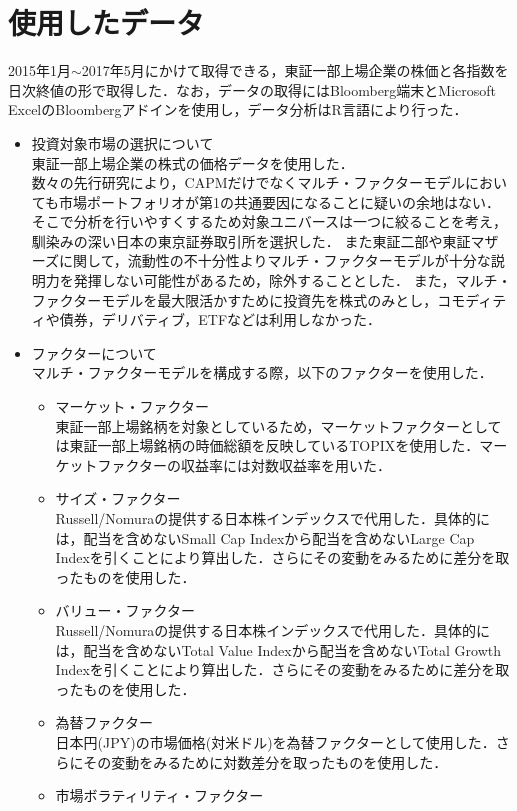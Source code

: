 \documentclass[11pt]{jreport}
\begin{document}
\section{使用したデータ}
2015年1月$\sim$2017年5月にかけて取得できる，東証一部上場企業の株価と各指数を日次終値の形で取得した．なお，データの取得にはBloomberg端末とMicrosoft ExcelのBloombergアドインを使用し，データ分析はR言語により行った．
\begin{itemize}
\item 投資対象市場の選択について\\
\quad 東証一部上場企業の株式の価格データを使用した．\\
\quad 数々の先行研究により，CAPMだけでなくマルチ・ファクターモデルにおいても市場ポートフォリオが第1の共通要因になることに疑いの余地はない．
そこで分析を行いやすくするため対象ユニバースは一つに絞ることを考え，馴染みの深い日本の東京証券取引所を選択した．
また東証二部や東証マザーズに関して，流動性の不十分性よりマルチ・ファクターモデルが十分な説明力を発揮しない可能性があるため，除外することとした．
また，マルチ・ファクターモデルを最大限活かすために投資先を株式のみとし，コモディティや債券，デリバティブ，ETFなどは利用しなかった．
\item ファクターについて\\
マルチ・ファクターモデルを構成する際，以下のファクターを使用した．
\begin{itemize}
\item マーケット・ファクター\\
東証一部上場銘柄を対象としているため，マーケットファクターとしては東証一部上場銘柄の時価総額を反映しているTOPIXを使用した．マーケットファクターの収益率には対数収益率を用いた．
\item サイズ・ファクター\\
Russell/Nomuraの提供する日本株インデックスで代用した．具体的には，配当を含めないSmall Cap Indexから配当を含めないLarge Cap Indexを引くことにより算出した．さらにその変動をみるために差分を取ったものを使用した．
\item バリュー・ファクター\\
Russell/Nomuraの提供する日本株インデックスで代用した．具体的には，配当を含めないTotal Value Indexから配当を含めないTotal Growth Indexを引くことにより算出した．さらにその変動をみるために差分を取ったものを使用した．
\item 為替ファクター\\
日本円(JPY)の市場価格(対米ドル)を為替ファクターとして使用した．さらにその変動をみるために対数差分を取ったものを使用した．
\item 市場ボラティリティ・ファクター\\

\end{itemize}
\end{itemize}
\end{document}
